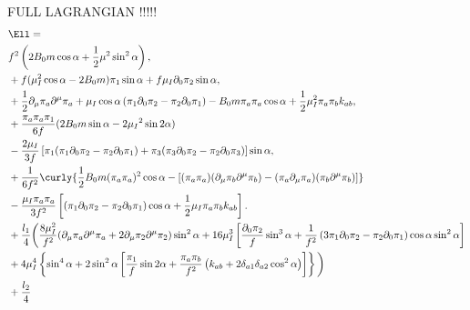 \documentclass{article}
\begin{document}
FULL LAGRANGIAN !!!!!
\begin{align*}
    & \Ell = \\
& 
    f^2   
    \left(
        2B_0m \cos{\alpha}
        + \frac{1}{2} \mu^2 \sin^2{\alpha}
    \right),
\\
& +
    f 
    (
        \mu_I^2\cos{\alpha}
        - 2B_0m
    ) \pi_1 \sin{\alpha}
    + f \mu_I \partial_0\pi_2 \sin{\alpha},
\\
& +
    \frac{1}{2} \partial_\mu\pi_a\partial^\mu\pi_a
    + \mu_I \cos{\alpha} \left( \pi_1 \partial_0\pi_2 - \pi_2\partial_0\pi_1 \right)
    - B_0m  \pi_a \pi_a \cos{\alpha}
    + \frac{1}{2} \mu_I ^2 \pi_a \pi_b k_{ab},
\\
& +
    \frac{\pi_a\pi_a \pi_1}{6f}
    (2B_0m \sin{\alpha}-2\mu_I{}^2 \sin{2\alpha})\\
    &
    -
    \frac{2 \mu_I}{3 f}
    \left[
        \pi_1(\pi_1 \partial_0\pi_2 - \pi_2\partial_0\pi_1)
        +
        \pi_3(\pi_3\partial_0\pi_2-\pi_2 \partial_0\pi_3)
    \right]
    \sin{\alpha},
\\
& +
\frac{1}{6f^2}
\curly{    
    \frac{1}{2} B_0m (\pi_a\pi_a)^2 \cos{\alpha}
    -
    \left[
        (\pi_a \pi_a) (\partial_\mu \pi_b \partial^\mu \pi_b )
        - (\pi_a \partial_\mu \pi_a)(\pi_b \partial^\mu \pi_b )
    \right]
}
\\
&
- \frac{\mu_I \pi_a\pi_a}{3f^2}
\left[
    \left(\pi_1\partial_0 \pi_2 - \pi_2 \partial_0 \pi_1\right)
    \cos{\alpha}
    + \frac{1}{2} \mu_I \pi_a \pi_b k_{ab}
\right].
 \\
 & + 
  \frac{l_1}{4} 
 \bigg(
     \frac{8 \mu_I^2}{f^2} 
     (\partial_\mu \pi_a \partial^\mu \pi_a + 2 \partial_\mu \pi_2 \partial^\mu \pi_2)
     \sin^2{\alpha}
     + 16 \mu_I^3 
     \left[
         \frac{\partial_0 \pi_2}{f}\sin^3{\alpha}
         + \frac{1}{f^2} 
         \left(
             3 \pi_1 \partial_0 \pi_2 - \pi_2 \partial_0 \pi_1
         \right)
             \cos{\alpha} \sin^2{\alpha}
     \right] \\
     & + 4 \mu_I^4 
     \left\{
         \sin^4{\alpha}
         + 2 \sin^2{\alpha}
         \left[
             \frac{\pi_1}{f}\sin{2\alpha}
             + \frac{\pi_a \pi_b}{f^2}        
             \left(k_{ab} + 2\delta_{a1}\delta_{a2}\cos^2{\alpha} \right)
         \right]
     \right\}
 \bigg)
 \\
 & + \frac{l_2}{4} 

\end{align*}
\end{document}

